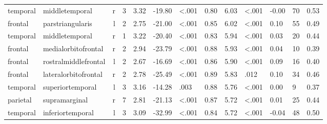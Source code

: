 \documentclass{article}
\begin{document}
\begin{longtable}{llrR{1.3cm}R{1cm}R{1.3cm}R{1cm}R{1cm}R{1.3cm}R{1cm}R{1.8cm}R{1.3cm}R{1.8cm}}
  temporal &            middletemporal &    r &         3 &                  3.32 &           -19.80 &      \textless.001 &                               0.80 &                          6.03 &                   \textless.001 &  -0.00 &     70 &      0.53 \\
   frontal &          parstriangularis &    l &         2 &                  2.75 &           -21.00 &      \textless.001 &                               0.85 &                          6.02 &                   \textless.001 &   0.10 &     55 &      0.49 \\
  temporal &            middletemporal &    r &         1 &                  3.22 &           -20.40 &      \textless.001 &                               0.83 &                          5.94 &                   \textless.001 &   0.03 &     20 &      0.44 \\
   frontal &       medialorbitofrontal &    r &         2 &                  2.94 &           -23.79 &      \textless.001 &                               0.88 &                          5.93 &                   \textless.001 &   0.04 &     10 &      0.39 \\
   frontal &      rostralmiddlefrontal &    l &         2 &                  2.67 &           -16.69 &      \textless.001 &                               0.86 &                          5.90 &                   \textless.001 &   0.09 &     16 &      0.40 \\
   frontal &      lateralorbitofrontal &    r &         2 &                  2.78 &           -25.49 &      \textless.001 &                               0.89 &                          5.83 &                            .012 &   0.10 &     34 &      0.46 \\
  temporal &          superiortemporal &    l &         3 &                  3.16 &           -14.28 &               .003 &                               0.88 &                          5.76 &                   \textless.001 &   0.00 &      9 &      0.37 \\
  parietal &             supramarginal &    r &         7 &                  2.81 &           -21.13 &      \textless.001 &                               0.87 &                          5.72 &                   \textless.001 &   0.01 &     25 &      0.44 \\
  temporal &          inferiortemporal &    l &         3 &                  3.09 &           -32.99 &      \textless.001 &                               0.84 &                          5.72 &                   \textless.001 &  -0.04 &     48 &      0.50 \\

\end{longtable}
\end{document}
